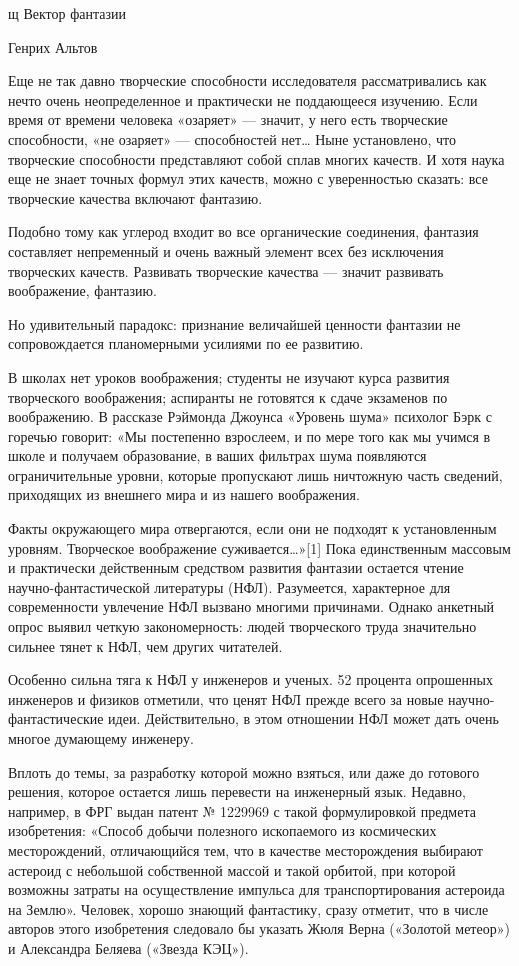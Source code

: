 щ
Вектор фантазии

Генрих Альтов


Еще не так давно творческие способности исследователя рассматривались  как
нечто очень  неопределенное и  практически не  поддающееся изучению.  Если
время от  времени человека  «озаряет»  — значит,  у него  есть  творческие
способности, «не  озаряет»  —  способностей  нет…  Ныне  установлено,  что
творческие способности  представляют собой  сплав многих  качеств. И  хотя
наука еще  не  знает точных  формул  этих качеств,  можно  с  уверенностью
сказать: все творческие качества включают фантазию.

Подобно тому как углерод входит  во все органические соединения,  фантазия
составляет  непременный  и  очень  важный  элемент  всех  без   исключения
творческих качеств.  Развивать  творческие  качества  —  значит  развивать
воображение, фантазию.

Но  удивительный  парадокс:  признание  величайшей  ценности  фантазии  не
сопровождается планомерными усилиями по ее развитию.

В школах  нет  уроков  воображения; студенты  не  изучают  курса  развития
творческого воображения;  аспиранты  не  готовятся к  сдаче  экзаменов  по
воображению. В рассказе  Рэймонда Джоунса «Уровень  шума» психолог Бэрк  с
горечью говорит: «Мы постепенно взрослеем, и по мере того как мы учимся  в
школе  и   получаем  образование,   в  ваших   фильтрах  шума   появляются
ограничительные уровни, которые пропускают лишь ничтожную часть  сведений,
приходящих из внешнего мира и из нашего воображения.

Факты окружающего мира отвергаются, если  они не подходят к  установленным
уровням.  Творческое   воображение  суживается…»[1]   Пока   единственным
массовым и практически  действенным средством  развития фантазии  остается
чтение научно-фантастической литературы (НФЛ). Разумеется, характерное для
современности увлечение  НФЛ вызвано  многими причинами.  Однако  анкетный
опрос выявил четкую  закономерность: людей  творческого труда  значительно
сильнее тянет к НФЛ, чем других читателей.

Особенно сильна тяга к  НФЛ у инженеров и  ученых. 52 процента  опрошенных
инженеров и  физиков  отметили,  что  ценят  НФЛ  прежде  всего  за  новые
научно-фантастические идеи. Действительно, в этом отношении НФЛ может дать
очень многое думающему инженеру.

Вплоть до темы, за разработку которой можно взяться, или даже до  готового
решения, которое  остается лишь  перевести  на инженерный  язык.  Недавно,
например, в  ФРГ выдан  патент №  1229969 с  такой формулировкой  предмета
изобретения:  «Способ   добычи   полезного  ископаемого   из   космических
месторождений, отличающийся  тем, что  в качестве  месторождения  выбирают
астероид с  небольшой  собственной массой  и  такой орбитой,  при  которой
возможны затраты на осуществление импульса для транспортирования астероида
на Землю». Человек, хорошо знающий фантастику, сразу отметит, что в  числе
авторов этого  изобретения  следовало  бы  указать  Жюля  Верна  («Золотой
метеор») и Александра Беляева («Звезда КЭЦ»).

